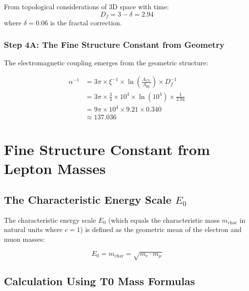 \documentclass[12pt,a4paper]{article}
\newcommand{\xipar}{\xi}  %
\begin{document}
	From topological considerations of 3D space with time:
	\begin{equation}
		D_f = 3 - \delta = 2.94
	\end{equation}
	where $\delta = 0.06$ is the fractal correction.
	
	\subsubsection{Step 4A: The Fine Structure Constant from Geometry}
	
	The electromagnetic coupling emerges from the geometric structure:
	
	\begin{keyresult}
		\begin{align}
			\alpha^{-1} &= 3\pi \times \xipar^{-1} \times \ln\left(\frac{\Lambda_{\text{UV}}}{\Lambda_{\text{IR}}}\right) \times D_f^{-1} \\
			&= 3\pi \times \frac{3}{4} \times 10^{4} \times \ln(10^{4}) \times \frac{1}{2.94} \\
			&= 9\pi \times 10^{4} \times 9.21 \times 0.340 \\
			&\approx 137.036
		\end{align}
	\end{keyresult}
	
\section{Fine Structure Constant from Lepton Masses}

\subsection{The Characteristic Energy Scale $E_0$}

The characteristic energy scale $E_0$ (which equals the characteristic mass $m_{\text{char}}$ in natural units where $c=1$) is defined as the geometric mean of the electron and muon masses:

\begin{equation}
	E_0 = m_{\text{char}} = \sqrt{m_e \cdot m_\mu}
\end{equation}

\subsection{Calculation Using T0 Mass Formulas}
\end{document}
